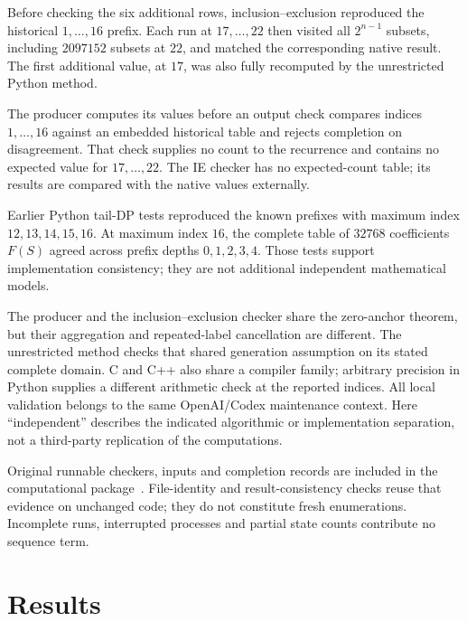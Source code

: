 \documentclass[11pt]{article}
\theoremstyle{definition}
\theoremstyle{remark}
\begin{document}
Before checking the six additional rows, inclusion--exclusion reproduced the
historical $1,\ldots,16$ prefix. Each run at $17,\ldots,22$ then visited
all $2^{n-1}$ subsets, including $2097152$ subsets at $22$, and matched
the corresponding native result. The first additional value, at $17$,
was also fully recomputed by the unrestricted Python method.

The producer computes its values before an output check compares indices
$1,\ldots,16$ against an embedded historical table and rejects completion
on disagreement. That check supplies no count to the recurrence and contains
no expected value for $17,\ldots,22$. The IE checker has no expected-count
table; its results are compared with the native values externally.

Earlier Python tail-DP tests reproduced the known prefixes with maximum
index $12,13,14,15,16$. At maximum index $16$, the complete table of
$32768$ coefficients $F(S)$ agreed across prefix depths $0,1,2,3,4$.
Those tests support implementation consistency;
they are not additional independent mathematical models.

The producer and the inclusion--exclusion checker share the zero-anchor
theorem, but their aggregation and repeated-label cancellation are different.
The unrestricted method checks that shared generation assumption on its
stated complete domain. C and C++ also share a compiler family; arbitrary
precision in Python supplies a different arithmetic check at the reported
indices. All local validation belongs to the same OpenAI/Codex maintenance
context. Here ``independent'' describes the indicated algorithmic or
implementation separation, not a third-party replication of the computations.

Original runnable checkers, inputs and completion records are included
in the computational package~\cite{corti}. File-identity and result-consistency checks reuse that evidence on
unchanged code; they do not constitute fresh enumerations. Incomplete runs,
interrupted processes and partial state counts contribute no sequence term.

\section{Results}
\label{sec:results}
\end{document}
